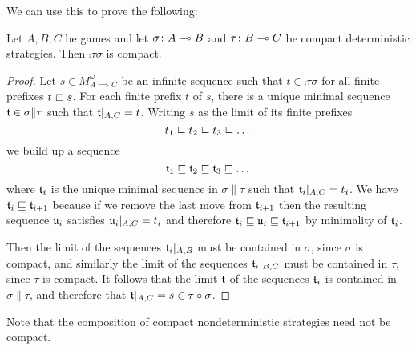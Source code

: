 \documentclass{article}
\begin{document}
We can use this to prove the following:

\begin{proposition}
  Let $A,B,C$ be games and let $\sigma\colon A\multimap B$ and $\tau\colon B\multimap C$ be compact deterministic strategies.  Then $\comp\tau\sigma$ is compact.
  \begin{proof}
    Let $s\in M_{A\implies C}^\omega$ be an infinite sequence such that $t\in\comp\tau\sigma$ for all finite prefixes $t\sqsubset s$.  For each finite prefix $t$ of $s$, there is a unique minimal sequence $\mathfrak t\in\sigma\|\tau$ such that $\mathfrak t\vert_{A,C}=t$.  Writing $s$ as the limit of its finite prefixes
    \[
      t_1 \sqsubseteq t_2 \sqsubseteq t_3 \sqsubseteq \dots
      \]
    we build up a sequence
    \[
      \mathfrak t_1 \sqsubseteq \mathfrak t_2 \sqsubseteq \mathfrak t_3 \sqsubseteq \dots
      \]
    where $\mathfrak t_i$ is the unique minimal sequence in $\sigma\|\tau$ such that $\mathfrak t_i\vert_{A,C}=t_i$.  We have $\mathfrak t_i\sqsubseteq\mathfrak t_{i+1}$ because if we remove the last move from $\mathfrak t_{i+1}$ then the resulting sequence $\mathfrak u_i$ satisfies $\mathfrak u_i\vert_{A,C}=t_i$ and therefore $\mathfrak t_i\sqsubseteq\mathfrak u_i\sqsubseteq\mathfrak t_{i+1}$ by minimality of $\mathfrak t_i$.  

    Then the limit of the sequences $\mathfrak t_i\vert_{A,B}$ must be contained in $\sigma$, since $\sigma$ is compact, and similarly the limit of the sequences $\mathfrak t_i\vert_{B,C}$ must be contained in $\tau$, since $\tau$ is compact.  It follows that the limit $\mathfrak t$ of the sequences $\mathfrak t_i$ is contained in $\sigma\|\tau$, and therefore that $\mathfrak t\vert_{A,C}=s\in\tau \circ \sigma$.
  \end{proof}
\end{proposition}

Note that the composition of compact nondeterministic strategies need not be compact.
\end{document}
